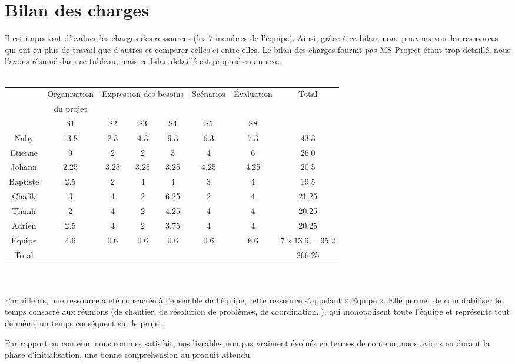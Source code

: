 \section{Bilan des charges}
Il est important d'évaluer les charges des ressources (les 7 membres de l'équipe). Ainsi, grâce à ce bilan, nous pouvons voir les ressources qui ont eu plus de travail que d'autres et comparer celles-ci entre elles. Le bilan des charges fournit pas MS Project étant trop détaillé, nous l'avons résumé dans ce tableau, mais ce bilan détaillé est proposé en annexe.
\\~\\
\begin{tabular}{c c c c c c c c}
    \multirow{3}{*}{~} & Organisation & \multicolumn{3}{c}{Expression des besoins} & Scénarios & Évaluation & \multirow{2}{*}{Total} \\
    & du projet & & & & & &\\
    & S1 & S2 & S3 & S4 & S5 & S8 & \\
    \hline
    Naby & 13.8 & 2.3 & 4.3 & 9.3 & 6.3 & 7.3 & 43.3 \\
    Etienne & 9 & 2 & 2 & 3 & 4 & 6 & 26.0 \\
    Johann & 2.25 & 3.25 & 3.25 & 3.25 & 4.25 & 4.25 & 20.5 \\
    Baptiste & 2.5 & 2 & 4 & 4 & 3 & 4 & 19.5 \\
    Chafik & 3 & 4 & 2 & 6.25 & 2 & 4 & 21.25 \\
    Thanh & 2 & 4 & 2 & 4.25 & 4 & 4 & 20.25 \\
    Adrien & 2.5 & 4 & 2 & 3.75 & 4 & 4 & 20.25 \\
    \hline
    Equipe & 4.6 & 0.6 & 0.6 & 0.6 & 0.6 & 6.6 & $7\times13.6$ = 95.2 \\
    \hline
    Total & \multicolumn{6}{c}{~} & 266.25
\end{tabular}
\\~\\
Par ailleurs, une ressource a été consacrée à l'ensemble de l'équipe, cette ressource s'appelant « Equipe ». Elle permet de comptabiliser le temps consacré aux réunions (de chantier, de résolution de problèmes, de coordination..), qui monopolisent toute l'équipe et représente tout de même un temps conséquent sur le projet.

Par rapport au contenu, nous sommes satisfait, nos livrables non pas vraiment évolués en termes de contenu, nous avions eu durant la phase d'initialisation, une bonne compréhension du produit attendu. 

